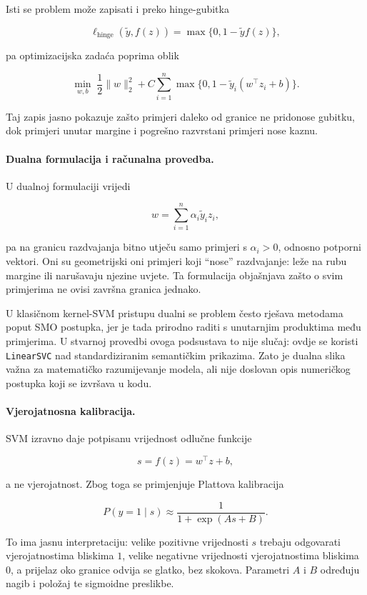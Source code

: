 \documentclass{article}
\begin{document}
Isti se problem može zapisati i preko hinge-gubitka

\[
\ell_{\mathrm{hinge}}(\tilde y,f(z)) = \max\{0,1-\tilde y f(z)\},
\]

pa optimizacijska zadaća poprima oblik

\[
\min_{w,b}\;\frac{1}{2}\|w\|_2^2 + C\sum_{i=1}^n \max\{0,1-\tilde y_i(w^\top z_i+b)\}.
\]

Taj zapis jasno pokazuje zašto primjeri daleko od granice ne pridonose gubitku, dok primjeri unutar margine i pogrešno razvrstani primjeri nose kaznu.

\paragraph{Dualna formulacija i računalna provedba.}
U dualnoj formulaciji vrijedi

\[
w=\sum_{i=1}^n \alpha_i \tilde y_i z_i,
\]

pa na granicu razdvajanja bitno utječu samo primjeri s $\alpha_i>0$, odnosno potporni vektori. Oni su geometrijski oni primjeri koji ``nose'' razdvajanje: leže na rubu margine ili narušavaju njezine uvjete. Ta formulacija objašnjava zašto o svim primjerima ne ovisi završna granica jednako.

U klasičnom kernel-SVM pristupu dualni se problem često rješava metodama poput SMO postupka, jer je tada prirodno raditi s unutarnjim produktima među primjerima. U stvarnoj provedbi ovoga podsustava to nije slučaj: ovdje se koristi \texttt{LinearSVC} nad standardiziranim semantičkim prikazima. Zato je dualna slika važna za matematičko razumijevanje modela, ali nije doslovan opis numeričkog postupka koji se izvršava u kodu.

\paragraph{Vjerojatnosna kalibracija.}
SVM izravno daje potpisanu vrijednost odlučne funkcije

\[
s=f(z)=w^\top z+b,
\]

a ne vjerojatnost. Zbog toga se primjenjuje Plattova kalibracija

\[
P(y=1\mid s)\approx \frac{1}{1+\exp(As+B)}.
\]

To ima jasnu interpretaciju: velike pozitivne vrijednosti $s$ trebaju odgovarati vjerojatnostima bliskima $1$, velike negativne vrijednosti vjerojatnostima bliskima $0$, a prijelaz oko granice odvija se glatko, bez skokova. Parametri $A$ i $B$ određuju nagib i položaj te sigmoidne preslikbe.
\end{document}
